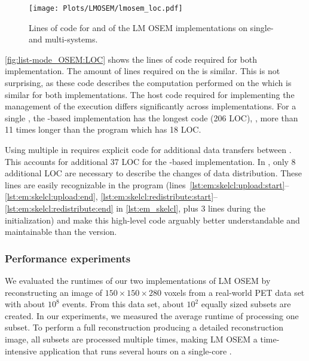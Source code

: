 \begin{figure}
  \centering
  \texttt{[image: Plots/LMOSEM/lmosem\_loc.pdf]}
  \caption[Lines of code of the LM OSEM implementations.]%
          {Lines of code for \CPU and \GPU of the LM OSEM implementations on single- and multi-\GPU systems.}
  \label{fig:list-mode_OSEM:LOC}
\end{figure}

\autoref{fig:list-mode_OSEM:LOC} shows the lines of code required for both implementation.
The amount of lines required on the \GPU is similar.
This is not surprising, as these code describes the computation performed on the \GPU which is similar for both implementations.
The host code required for implementing the management of the \GPU execution differs significantly across implementations.
For a single \GPU, the \OpenCL-based implementation has the longest code (206 LOC), \ie, more than 11 times longer than the \SkelCL program which has 18 LOC.

Using multiple \GPUs in \OpenCL requires explicit code for additional data transfers between \GPUs.
This accounts for additional 37 LOC for the \OpenCL-based implementation.
In \SkelCL, only 8 additional LOC are necessary to describe the changes of data distribution.
These lines are easily recognizable in the \SkelCL program (lines~\ref{lst:em:skelcl:upload:start}--\ref{lst:em:skelcl:upload:end}, \ref{lst:em:skelcl:redistribute:start}--\ref{lst:em:skelcl:redistribute:end} in \autoref{lst:em_skelcl}, plus 3 lines during the initialization) and make this high-level code arguably better understandable and maintainable than the \OpenCL version.













\subsubsection*{Performance experiments}
We evaluated the runtimes of our two implementations of LM OSEM by reconstructing an image of $150\times 150\times 280$ voxels from a real-world PET data set with about $10^8$ events.
From this data set, about $10^2$ equally sized subsets are created.
In our experiments, we measured the average runtime of processing one subset.
To perform a full reconstruction producing a detailed reconstruction image, all subsets are processed multiple times, making LM OSEM a time-intensive application that runs several hours on a single-core \CPU.

